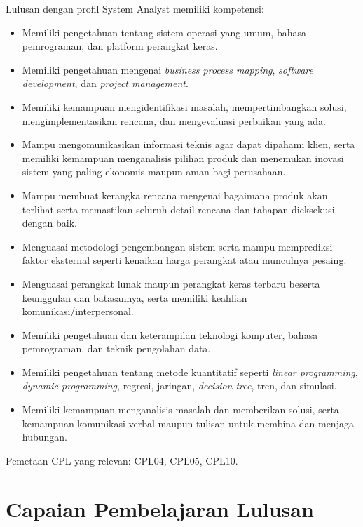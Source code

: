 Lulusan dengan profil System Analyst memiliki kompetensi:
\begin{itemize}
\item Memiliki pengetahuan tentang sistem operasi yang umum, bahasa pemrograman, dan platform perangkat keras.
\item Memiliki pengetahuan mengenai \textit{business process mapping}, \textit{software development}, dan \textit{project management}.
\item Memiliki kemampuan mengidentifikasi masalah, mempertimbangkan solusi, mengimplementasikan rencana, dan mengevaluasi perbaikan yang ada.
\item Mampu mengomunikasikan informasi teknis agar dapat dipahami klien, serta memiliki kemampuan menganalisis pilihan produk dan menemukan inovasi sistem yang paling ekonomis maupun aman bagi perusahaan.
\item Mampu membuat kerangka rencana mengenai bagaimana produk akan terlihat serta memastikan seluruh detail rencana dan tahapan dieksekusi dengan baik.
\item Menguasai metodologi pengembangan sistem serta mampu memprediksi faktor eksternal seperti kenaikan harga perangkat atau munculnya pesaing.
\item Menguasai perangkat lunak maupun perangkat keras terbaru beserta keunggulan dan batasannya, serta memiliki keahlian komunikasi/interpersonal.
\item Memiliki pengetahuan dan keterampilan teknologi komputer, bahasa pemrograman, dan teknik pengolahan data.
\item Memiliki pengetahuan tentang metode kuantitatif seperti \textit{linear programming}, \textit{dynamic programming}, regresi, jaringan, \textit{decision tree}, tren, dan simulasi.
\item Memiliki kemampuan menganalisis masalah dan memberikan solusi, serta kemampuan komunikasi verbal maupun tulisan untuk membina dan menjaga hubungan.
\end{itemize}
Pemetaan CPL yang relevan: CPL04, CPL05, CPL10.

\section{Capaian Pembelajaran Lulusan}

